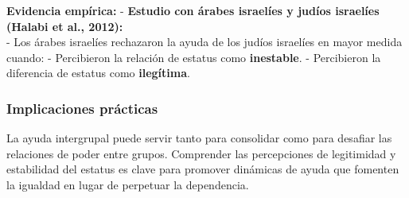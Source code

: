 \documentclass[
]{book}
\begin{document}
\textbf{Evidencia empírica:}
- \textbf{Estudio con árabes israelíes y judíos israelíes (Halabi et al., 2012):}\\
- Los árabes israelíes rechazaron la ayuda de los judíos israelíes en mayor medida cuando:
- Percibieron la relación de estatus como \textbf{inestable}.
- Percibieron la diferencia de estatus como \textbf{ilegítima}.

\subsubsection{Implicaciones prácticas}\label{implicaciones-pruxe1cticas}

La ayuda intergrupal puede servir tanto para consolidar como para desafiar las relaciones de poder entre grupos. Comprender las percepciones de legitimidad y estabilidad del estatus es clave para promover dinámicas de ayuda que fomenten la igualdad en lugar de perpetuar la dependencia.
\end{document}
